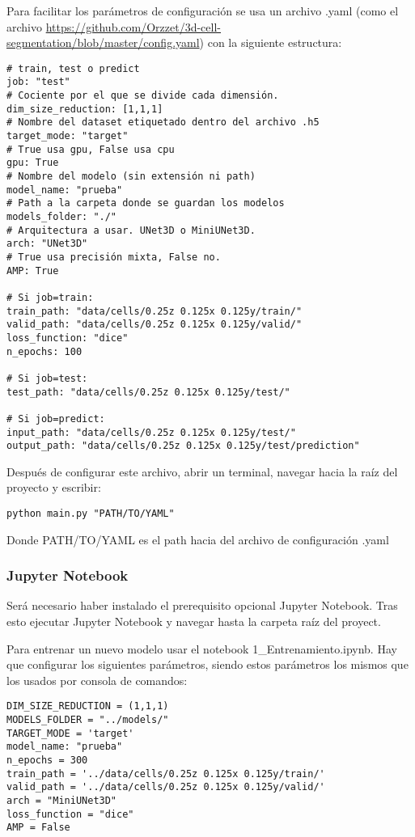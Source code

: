 Para facilitar los parámetros de configuración se usa un archivo .yaml (como el archivo \url{https://github.com/Orzzet/3d-cell-segmentation/blob/master/config.yaml}) con la siguiente estructura:
\begin{verbatim}
# train, test o predict
job: "test" 
# Cociente por el que se divide cada dimensión.
dim_size_reduction: [1,1,1]
# Nombre del dataset etiquetado dentro del archivo .h5
target_mode: "target" 
# True usa gpu, False usa cpu
gpu: True
# Nombre del modelo (sin extensión ni path)
model_name: "prueba"
# Path a la carpeta donde se guardan los modelos 
models_folder: "./"
# Arquitectura a usar. UNet3D o MiniUNet3D. 
arch: "UNet3D"
# True usa precisión mixta, False no. 
AMP: True

# Si job=train:
train_path: "data/cells/0.25z 0.125x 0.125y/train/"
valid_path: "data/cells/0.25z 0.125x 0.125y/valid/"
loss_function: "dice"
n_epochs: 100

# Si job=test:
test_path: "data/cells/0.25z 0.125x 0.125y/test/"

# Si job=predict:
input_path: "data/cells/0.25z 0.125x 0.125y/test/"
output_path: "data/cells/0.25z 0.125x 0.125y/test/prediction"
\end{verbatim}

Después de configurar este archivo, abrir un terminal, navegar hacia la raíz del proyecto y escribir:

\begin{verbatim}
python main.py "PATH/TO/YAML"
\end{verbatim}

Donde PATH/TO/YAML es el path hacia del archivo de configuración .yaml

\subsubsection{Jupyter Notebook}

Será necesario haber instalado el prerequisito opcional Jupyter Notebook. Tras esto ejecutar Jupyter Notebook y navegar hasta la carpeta raíz del proyect.

Para entrenar un nuevo modelo usar el notebook 1\_Entrenamiento.ipynb. Hay que configurar los siguientes parámetros, siendo estos parámetros los mismos que los usados por consola de comandos:

\begin{verbatim}
DIM_SIZE_REDUCTION = (1,1,1)
MODELS_FOLDER = "../models/"
TARGET_MODE = 'target'
model_name: "prueba"
n_epochs = 300
train_path = '../data/cells/0.25z 0.125x 0.125y/train/'
valid_path = '../data/cells/0.25z 0.125x 0.125y/valid/'
arch = "MiniUNet3D"
loss_function = "dice"
AMP = False
\end{verbatim}

